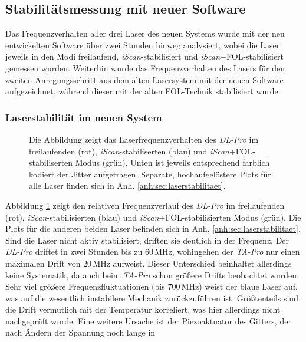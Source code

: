 \subsection{Stabilitätsmessung mit neuer
Software}\label{sec:stabilitaetsmessungen_software} Das Frequenzverhalten
aller drei Laser des neuen Systems wurde mit der neu entwickelten Software über zwei Stunden hinweg analysiert, wobei die
Laser jeweils in den Modi freilaufend, \textit{iScan}-stabilisiert und
\textit{iScan}+FOL-stabilisiert gemessen wurden. Weiterhin wurde das
Frequenzverhalten des Lasers für den zweiten Anregungsschritt aus dem alten Lasersystem mit der neuen Software aufgezeichnet,
während dieser mit der alten FOL-Technik stabilisiert wurde.

\subsubsection{Laserstabilität im neuen
System}\label{subsubsec:stabilitaetsmessungen_software_neues_system}
\begin{figure}[h]
 	\centering
 	\footnotesize
	
	\caption[Laserfrequenzverhalten \textit{DL-Pro}]{Die Abbildung zeigt das
	Laserfrequenzverhalten des \textit{DL-Pro} im freilaufenden (rot),
	\textit{iScan}-stabiliserten (blau) und \textit{iScan}+FOL-stabiliserten Modus
	(grün).
	Unten ist jeweils entsprechend farblich kodiert der Jitter aufgetragen.
	Separate, hochaufgelöstere Plots für alle Laser finden sich in Anh.
	\ref{anh:sec:laserstabilitaet}.}
	\label{fig:laserstabilitaet_b_alles}
\end{figure}
Abbildung \ref{fig:laserstabilitaet_b_alles} zeigt den relativen
Frequenzverlauf des \textit{DL-Pro} im freilaufenden (rot),
\textit{iScan}-stabilisierten (blau) und \textit{iScan}+FOL-stabilisierten Modus
(grün). Die Plots für die anderen beiden Laser befinden sich in Anh.
\ref{anh:sec:laserstabilitaet}. Sind die Laser nicht aktiv stabilisiert, driften
sie deutlich in der Frequenz. Der \textit{DL-Pro} driftet in zwei Stunden bis zu $60\,$MHz, wohingehen der
\textit{TA-Pro} nur einen maximalen Drift von $20\,$MHz aufweist. Dieser
Unterschied beinhaltet allerdings keine Systematik, da auch beim \textit{TA-Pro}
schon größere Drifts beobachtet wurden. Sehr viel größere Frequenzfluktuationen (bis $700\,$MHz)
weist der blaue Laser auf, was auf die wesentlich instabilere Mechanik
zurückzuführen ist. Größtenteils sind die Drift vermutlich mit der Temperatur
korreliert, was hier allerdings nicht nachgeprüft wurde. Eine weitere Ursache
ist der Piezoaktuator des Gitters, der nach Ändern der Spannung noch lange in
